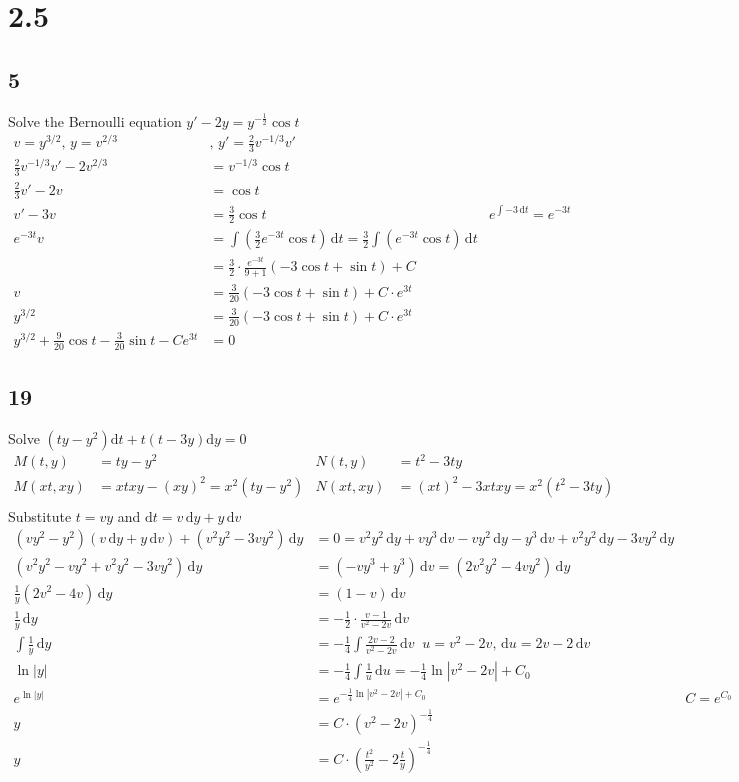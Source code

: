 \documentclass{article}
\begin{document}
\section*{2.5}
\subsection*{5}
Solve the Bernoulli equation $y'-2y=y^{-\frac{1}{2}}\cos t$
\begin{align*}
v=y^{3/2},\,y=v^{2/3}&,\,y'=\frac{2}{3}v^{-1/3}v'\\
\frac{2}{3}v^{-1/3}v'-2v^{2/3}&=v^{-1/3}\cos t\\
\frac{2}{3}v'-2v&=\cos t\\
v'-3v&=\frac{3}{2}\cos t & e^{\int{-3\,\mathrm{d}t}}=e^{-3t}\\
e^{-3t}v&=\int{\left(\frac{3}{2}e^{-3t}\cos t\right)\,\mathrm{d}t}=\frac{3}{2}\int{\left(e^{-3t}\cos t\right)\,\mathrm{d}t}\\
&=\frac{3}{2}\cdot\frac{e^{-3t}}{9+1}(-3\cos t+\sin t)+C\\
v&=\frac{3}{20}(-3\cos t+\sin t)+C\cdot e^{3t}\\
y^{3/2}&=\frac{3}{20}(-3\cos t+\sin t)+C\cdot e^{3t}\\
y^{3/2}+\frac{9}{20}\cos t-\frac{3}{20}\sin t-Ce^{3t}&=0
\end{align*}
\subsection*{19}
Solve $\left(ty-y^2\right)\mathrm{d}t+t\left(t-3y\right)\mathrm{d}y=0$
\begin{align*}
M(t,y)&=ty-y^2 & N(t,y)&=t^2-3ty\\
M(xt,xy)&=xtxy-(xy)^2=x^2(ty-y^2) & N(xt,xy)&=(xt)^2-3xtxy=x^2(t^2-3ty)\\
\end{align*}
Substitute $t=vy$ and $\mathrm{d}t=v\,\mathrm{d}y+y\,\mathrm{d}v$
\begin{align*}
(vy^2-y^2)(v\,\mathrm{d}y+y\,\mathrm{d}v)+(v^2y^2-3vy^2)\,\mathrm{d}y&=0=v^2y^2\,\mathrm{d}y+vy^3\,\mathrm{d}v-vy^2\,\mathrm{d}y-y^3\,\mathrm{d}v+v^2y^2\,\mathrm{d}y-3vy^2\,\mathrm{d}y\\
(v^2y^2-vy^2+v^2y^2-3vy^2)\,\mathrm{d}y&=(-vy^3+y^3)\,\mathrm{d}v=(2v^2y^2-4vy^2)\,\mathrm{d}y\\
\frac{1}{y}(2v^2-4v)\,\mathrm{d}y&=(1-v)\,\mathrm{d}v\\
\frac{1}{y}\,\mathrm{d}y&=-\frac{1}{2}\cdot\frac{v-1}{v^2-2v}\,\mathrm{d}v\\
\int{\frac{1}{y}\,\mathrm{d}y}&=-\frac{1}{4}\int{\frac{2v-2}{v^2-2v}\,\mathrm{d}v}\;\;u=v^2-2v,\,\mathrm{d}u=2v-2\,\mathrm{d}v\\
\ln |y|&=-\frac{1}{4}\int{\frac{1}{u}}\,\mathrm{d}u=-\frac{1}{4}\ln \left\lvert v^2-2v\right\rvert+C_0\\
e^{\ln |y|}&=e^{-\frac{1}{4}\ln \left\lvert v^2-2v\right\rvert+C_0}&C=e^{C_0}\\
y&=C\cdot(v^2-2v)^{-\frac{1}{4}}\\
y&=C\cdot\left(\frac{t^2}{y^2}-2\frac{t}{y}\right)^{-\frac{1}{4}}\\
\end{align*}
\end{document}

